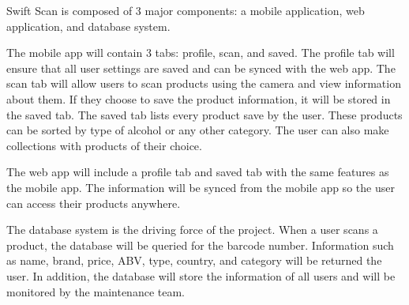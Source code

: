 Swift Scan is composed of 3 major components: a mobile application, web application, and database system.

The mobile app will contain 3 tabs: profile, scan, and saved. The profile tab will ensure that all user settings are saved and can be synced with the web app. The scan tab will allow users to scan products using the camera and view information about them. If they choose to save the product information, it will be stored in the saved tab. The saved tab lists every product save by the user. These products can be sorted by type of alcohol or any other category. The user can also make collections with products of their choice.

The web app will include a profile tab and saved tab with the same features as the mobile app. The information will be synced from the mobile app so the user can access their products anywhere.

The database system is the driving force of the project. When a user scans a product, the database will be queried for the barcode number. Information such as name, brand, price, ABV, type, country, and category will be returned the user. In addition, the database will store the information of all users and will be monitored by the maintenance team.
